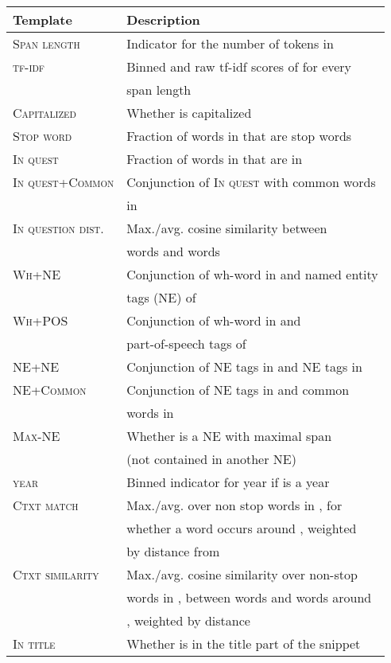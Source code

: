\documentclass[11pt,a4paper]{article}
\begin{document}
\begin{table}[t]
\begin{center}
\scriptsize{
\begin{tabular}{l|l}
 \toprule
 \textbf{Template} & \textbf{Description}  \\ 
 \midrule
\textsc{Span length} & Indicator for the number of tokens in     \\ 
\textsc{tf-idf} & Binned and raw tf-idf scores of  for every \\ & span length  \\ 
\textsc{Capitalized} & Whether  is capitalized  \\ 
\textsc{Stop word} & Fraction of words in  that are stop words  \\ 
\textsc{In quest} & Fraction of words in  that are in \\
\textsc{In quest+Common} & Conjunction of \textsc{In quest} with common words \\ & in  \\ 
\textsc{In question dist.} & Max./avg.
cosine similarity between  \\ & words and  words\\
\textsc{Wh+NE} & Conjunction of wh-word in  and named entity \\ & tags (NE) of \\
\textsc{Wh+POS} & Conjunction of wh-word in  and \\ & part-of-speech tags of \\
\textsc{NE+NE} & Conjunction of NE tags in  and NE tags in \\
\textsc{NE+Common} & Conjunction of NE tags in  and common \\ & words in  \\
\textsc{Max-NE} & Whether  is a NE with maximal span \\ &  (not contained in another NE) \\
\textsc{year} & Binned indicator for year if  is a year \\
\midrule
\textsc{Ctxt match} & Max./avg. over non stop words in , for \\ & whether a  word    occurs around , weighted \\ & by distance  from  \\
\textsc{Ctxt similarity} & Max./avg. cosine similarity over non-stop \\
& words in , between  words and words around \\
& ,  weighted by distance \\
\textsc{In title} & Whether  is in the title part of the snippet  \\ 

\end{tabular}}
\end{center}
\end{table}
\end{document}
